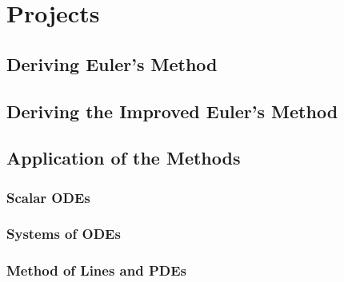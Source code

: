 \chapter{Projects}
\label{chap:Projects}

\section{Deriving Euler's Method}

\section{Deriving the Improved Euler's Method}

\section{Application of the Methods}

\subsection{Scalar ODEs}

\subsection{Systems of ODEs}

\subsection{Method of Lines and PDEs}
